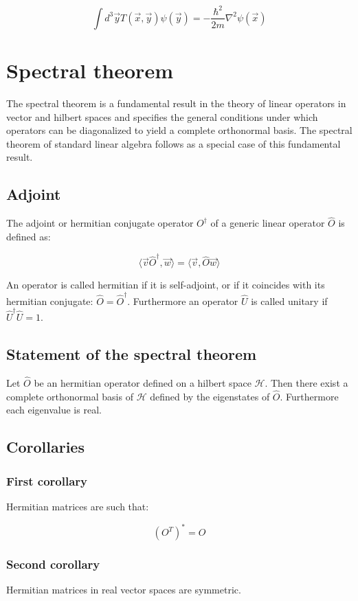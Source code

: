 		$$\int d^3\vec{y}T(\vec{x}, \vec{y})\psi(\vec{y}) = -\frac{\hbar^2}{2m}\nabla^2\psi(\vec{x})$$

\section{Spectral theorem}
The spectral theorem is a fundamental result in the theory of linear operators in vector and hilbert spaces and specifies the general conditions under which operators can be diagonalized to yield a complete orthonormal basis.
The spectral theorem of standard linear algebra follows as a special case of this fundamental result.

	\subsection{Adjoint}
	The adjoint or hermitian conjugate operator $O^\dagger$ of a generic linear operator $\hat{O}$ is defined as:

	$$\langle \vec{v}\hat{O}^\dagger, \vec{w}\rangle = \langle\vec{v}, \hat{O}\vec{w}\rangle$$

	An operator is called hermitian if it is self-adjoint, or if it coincides with its hermitian conjugate: $\hat{O} = \hat{O}^\dagger$.
	Furthermore an operator $\hat{U}$ is called unitary if $\hat{U}^\dagger\hat{U} = 1$.

	\subsection{Statement of the spectral theorem}
	Let $\hat{O}$ be an hermitian operator defined on a hilbert space $\mathcal{H}$.
	Then there exist a complete orthonormal basis of $\mathcal{H}$ defined by the eigenstates of $\hat{O}$.
	Furthermore each eigenvalue is real.

	\subsection{Corollaries}

		\subsubsection{First corollary}
		Hermitian matrices are such that:

		$$(O^T)^* = O$$

		\subsubsection{Second corollary}
		Hermitian matrices in real vector spaces are symmetric.

